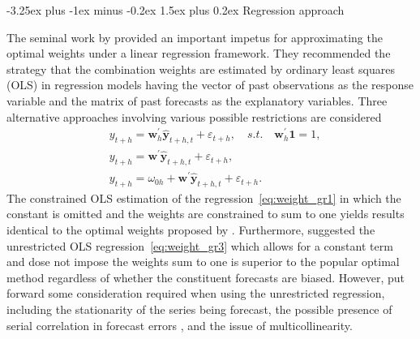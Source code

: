 \documentclass[11pt]{article}
\makeatletter
\renewcommand{\paragraph}{\@startsection{paragraph}{4}{0ex}%
   {-3.25ex plus -1ex minus -0.2ex}%
   {1.5ex plus 0.2ex}%
   {\normalfont\normalsize\bfseries}}
\makeatother
\begin{document}

\paragraph{Regression approach}

The seminal work by \cite{Granger1984-jc} provided an important impetus for approximating the optimal weights under a linear regression framework. They recommended the strategy that the combination weights are estimated by ordinary least squares (OLS) in regression models having the vector of past observations as the response variable and the matrix of past forecasts as the explanatory variables. Three alternative approaches involving various possible restrictions are considered
\begin{align}
&y_{t+h}=\boldsymbol{w}_{h}^{\prime} \hat{\mathbf{y}}_{t+h, t}+\varepsilon_{t+h}, \quad s.t. \quad \boldsymbol{w}_{h}^{\prime}\mathbf{1}=1, \label{eq:weight_gr1}\\
&y_{t+h}=\boldsymbol{w}^{\prime} \hat{\mathbf{y}}_{t+h, t}+\varepsilon_{t+h},  \label{eq:weight_gr2}\\
&y_{t+h}=\omega_{0h}+\boldsymbol{w}^{\prime} \hat{\mathbf{y}}_{t+h, t}+\varepsilon_{t+h}. \label{eq:weight_gr3}
\end{align}
The constrained OLS estimation of the regression~\eqref{eq:weight_gr1} in which the constant is omitted and the weights are constrained to sum to one yields results identical to the optimal weights proposed by \cite{Bates1969-yj}. Furthermore, \cite{Granger1984-jc} suggested the unrestricted OLS regression~\eqref{eq:weight_gr3} which allows for a constant term and dose not impose the weights sum to one is superior to the popular optimal method regardless of whether the constituent forecasts are biased. However, \cite{De_Menezes2000-vd} put forward some consideration required when using the unrestricted regression, including the stationarity of the series being forecast, the possible presence of serial correlation in forecast errors \citep[see also][]{Diebold1988-sx,Edward_Coulson1993-db}, and the issue of multicollinearity.
\end{document}
